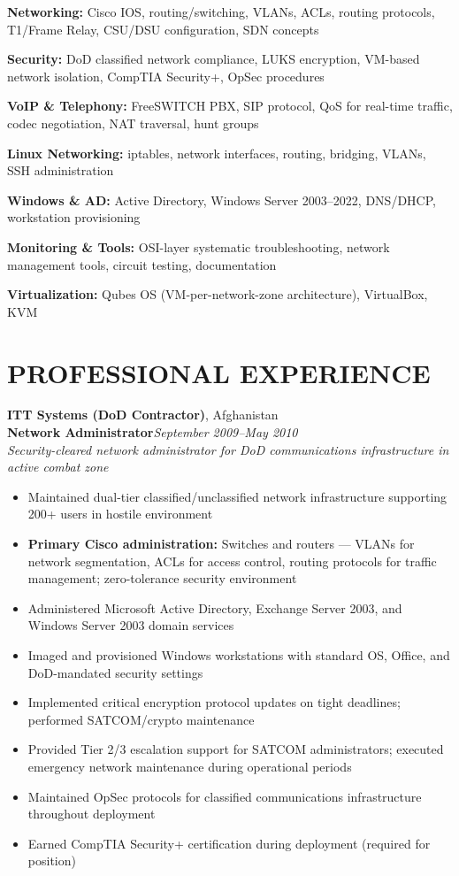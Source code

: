 \documentclass[9pt,letterpaper]{extarticle}
\begin{document}
\noindent\textbf{Networking:} Cisco IOS, routing/switching, VLANs, ACLs, routing protocols, T1/Frame Relay, CSU/DSU configuration, SDN concepts

\noindent\textbf{Security:} DoD classified network compliance, LUKS encryption, VM-based network isolation, CompTIA Security+, OpSec procedures

\noindent\textbf{VoIP \& Telephony:} FreeSWITCH PBX, SIP protocol, QoS for real-time traffic, codec negotiation, NAT traversal, hunt groups

\noindent\textbf{Linux Networking:} iptables, network interfaces, routing, bridging, VLANs, SSH administration

\noindent\textbf{Windows \& AD:} Active Directory, Windows Server 2003--2022, DNS/DHCP, workstation provisioning

\noindent\textbf{Monitoring \& Tools:} OSI-layer systematic troubleshooting, network management tools, circuit testing, documentation

\noindent\textbf{Virtualization:} Qubes OS (VM-per-network-zone architecture), VirtualBox, KVM

\section*{PROFESSIONAL EXPERIENCE}

\noindent\textbf{ITT Systems (DoD Contractor)}, Afghanistan\\
\textbf{Network Administrator}\hfill\textit{September 2009--May 2010}\\
\textit{Security-cleared network administrator for DoD communications infrastructure in active combat zone}
\begin{itemize}
  \item Maintained dual-tier classified/unclassified network infrastructure supporting 200+ users in hostile environment
  \item \textbf{Primary Cisco administration:} Switches and routers --- VLANs for network segmentation, ACLs for access control, routing protocols for traffic management; zero-tolerance security environment
  \item Administered Microsoft Active Directory, Exchange Server 2003, and Windows Server 2003 domain services
  \item Imaged and provisioned Windows workstations with standard OS, Office, and DoD-mandated security settings
  \item Implemented critical encryption protocol updates on tight deadlines; performed SATCOM/crypto maintenance
  \item Provided Tier 2/3 escalation support for SATCOM administrators; executed emergency network maintenance during operational periods
  \item Maintained OpSec protocols for classified communications infrastructure throughout deployment
  \item Earned CompTIA Security+ certification during deployment (required for position)
\end{itemize}
\end{document}
